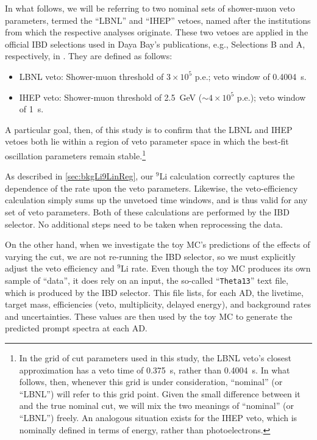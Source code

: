 \documentclass[../thesis.tex]{subfiles}
\begin{document}
In what follows, we will be referring to two nominal sets of shower-muon veto parameters, termed the ``LBNL'' and ``IHEP'' vetoes, named after the institutions from which the respective analyses originate. These two vetoes are applied in the official IBD selections used in Daya Bay's publications, e.g., Selections B and A, respectively, in \cite{An_2017}. They are defined as follows:
\begin{itemize}
\item LBNL veto: Shower-muon threshold of $3\times10^5$ p.e.; veto window of 0.4004~s.
\item IHEP veto: Shower-muon threshold of 2.5~GeV ($\sim4\times10^5$ p.e.); veto window of 1~s.
\end{itemize}
A particular goal, then, of this study is to confirm that the LBNL and IHEP vetoes both lie within a region of veto parameter space in which the best-fit oscillation parameters remain stable.\footnote{In the grid of cut parameters used in this study, the LBNL veto's closest approximation has a veto time of 0.375~s, rather than 0.4004~s. In what follows, then, whenever this grid is under consideration, ``nominal'' (or ``LBNL'') will refer to this grid point. Given the small difference between it and the true nominal cut, we will mix the two meanings of ``nominal'' (or ``LBNL'') freely. An analogous situation exists for the IHEP veto, which is nominally defined in terms of energy, rather than photoelectrons.}

As described in \autoref{sec:bkgLi9LinReg}, our $^9$Li calculation correctly captures the dependence of the rate upon the veto parameters. Likewise, the veto-efficiency calculation simply sums up the unvetoed time windows, and is thus valid for any set of veto parameters. Both of these calculations are performed by the IBD selector. No additional steps need to be taken when reprocessing the data.

On the other hand, when we investigate the toy MC's predictions of the effects of varying the cut, we are not re-running the IBD selector, so we must explicitly adjust the veto efficiency and $^9$Li rate. Even though the toy MC produces its own sample of ``data'', it does rely on an input, the so-called ``\texttt{Theta13}'' text file, which is produced by the IBD selector. This file lists, for each AD, the livetime, target mass, efficiencies (veto, multiplicity, delayed energy), and background rates and uncertainties. These values are then used by the toy MC to generate the predicted prompt spectra at each AD\@.
\end{document}
